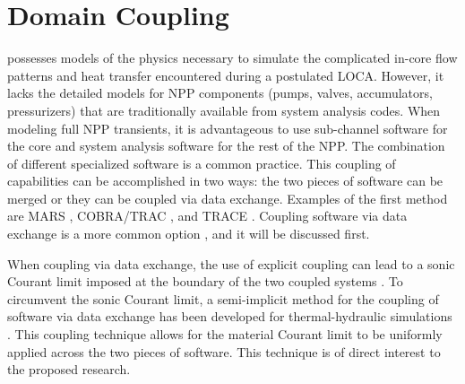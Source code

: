 \section{Domain Coupling}
\label{sect:code_coupling}

\cobra{} possesses models of the physics necessary to simulate the complicated in-core flow patterns and heat transfer encountered during a postulated LOCA.
However, it lacks the detailed models for NPP components (pumps, valves, accumulators, pressurizers) that are traditionally available from system analysis codes.
When modeling full NPP transients, it is advantageous to use sub-channel software for the core and system analysis software for the rest of the NPP.
The combination of different specialized software is a common practice.
This coupling of capabilities can be accomplished in two ways: the two pieces of software can be merged or they can be coupled via data exchange.
Examples of the first method are MARS \cite{Jeong2008}, COBRA/TRAC \cite{Thurgood1983c}, and TRACE \cite{TRACE}.
Coupling software via data exchange is a more common option \cite{Makihara2003, Aumiller2002, Aumiller2001, Avramova2006, Weaver2002, Rodriguez2002}, and it will be discussed first.

When coupling via data exchange, the use of explicit coupling can lead to a sonic Courant limit imposed at the boundary of the two coupled systems \cite{Ragusa2009, Aumiller2001}.
To circumvent the sonic Courant limit, a semi-implicit method for the coupling of software via data exchange has been developed for thermal-hydraulic simulations \cite{Weaver2002, Aumiller2002}.
This coupling technique allows for the material Courant limit to be uniformly applied across the two pieces of software.
This technique is of direct interest to the proposed research.

